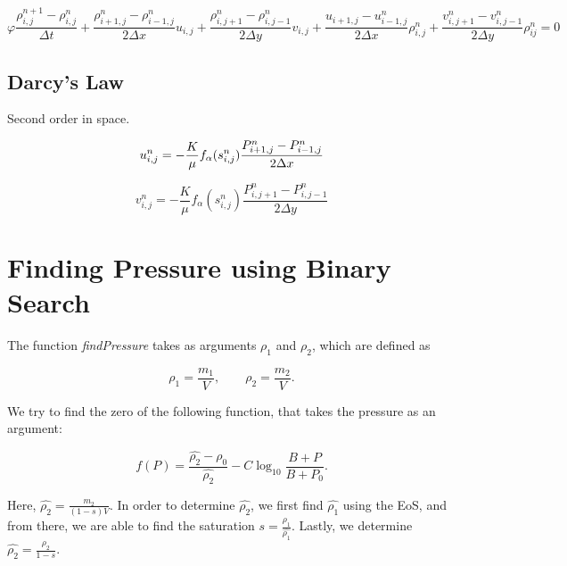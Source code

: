 \documentclass[a4paper,12pt]{article}
\begin{document}
\[
\varphi \frac{\rho^{n + 1}_{i, j} - \rho^n_{i, j}}{\Delta t}
+ \frac{\rho_{i+1, j}^n - \rho_{i-1,j}^n}{2\Delta x} u_{i,j}
+ \frac{\rho_{i, j+1}^n - \rho_{i,j-1}^n}{2\Delta y} v_{i,j}
+ \frac{u_{i+1, j} - u_{i-1,j}^n}{2\Delta x} \rho_{i,j}^n
+ \frac{v_{i, j+1}^n - v_{i,j-1}^n}{2\Delta y} \rho_{ij}^n = 0
\] 

\subsection{Darcy's Law}

Second order in space.

\[
    u_{i,j}^n = -\frac{K}{\mu} f_\alpha (s_{i, j}^n)
    \frac{P_{i + 1, j}^n - P_{i - 1, j}^n}{2\Delta x} \\
\] 

\[
    v_{i,j}^n = -\frac{K}{\mu} f_\alpha(s_{i, j}^n)
    \frac{P_{i, j + 1}^n - P_{i, j - 1}^n}{2\Delta y}
\] 

\section{Finding Pressure using Binary Search}

The function \emph{findPressure} takes as arguments
\(\rho_1\) and \(\rho_2\), which are defined as

\[
\rho_1 = \frac{m_1}{V}, \qquad
\rho_2 = \frac{m_2}{V}
.\] 

We try to find the zero of the following function, that
takes the pressure as an argument:

\begin{equation*}
    f(P) = \frac{\hat{\rho_2} - \rho_0}{\hat{\rho_2}}
    - C \log_{10} \frac{B + P}{B + P_0}
.\end{equation*}

Here, \(\hat{\rho_2} = \frac{m_2}{(1 - s)V}\).
In order to determine \(\hat{\rho_2}\), we first find
\(\hat{\rho_1}\) using the EoS, and from there, we are
able to find the saturation
\(s = \frac{\rho_1}{\hat{\rho_1}}\).
Lastly, we determine \(\hat{\rho_2} = \frac{\rho_2}{1 - s}\).

% 
% 
% 
\end{document}
